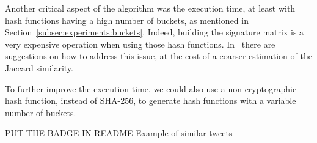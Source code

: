 \documentclass[runningheads]{llncs}
\begin{document}
Another critical aspect of the algorithm was the execution time, at least with hash functions having a high number of buckets, as mentioned in Section~\ref{subsec:experiments:buckets}. Indeed, building the signature matrix is a very expensive operation when using those hash functions. In~\cite{leskovec_2020} there are suggestions on how to address this issue, at the cost of a coarser estimation of the Jaccard similarity.

To further improve the execution time, we could also use a non-cryptographic hash function, instead of SHA-256, to generate hash functions with a variable number of buckets.

PUT THE BADGE IN README
Example of similar tweets




\end{document}
